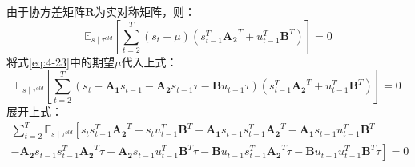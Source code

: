 由于协方差矩阵$\mathbf{R}$为实对称矩阵，则：
\begin{equation}
    \mathbb{E}_{s \mid \tau^{old}}\left[\sum_{t=2}^T \left(s_t-\mu\right)\left(s_{t-1}^T\mathbf{A_2}^T +u_{t-1}^T\mathbf{B}^T \right)\right] = 0
    \label{eq:4-29}
\end{equation}
将式\ref{eq:4-23}中的期望$\mu$代入上式：
\begin{equation}
    \mathbb{E}_{s \mid \tau^{old}}\left[\sum_{t=2}^T \left(s_t-\mathbf{A_1}s_{t-1}-\mathbf{A_2}s_{t-1}\tau-\mathbf{B}u_{t-1}\tau \right)\left(s_{t-1}^T\mathbf{A_2}^T +u_{t-1}^T\mathbf{B}^T \right)\right] = 0
    \label{eq:4-30}
\end{equation}
展开上式：
\begin{equation}
    \begin{gathered}
    \sum_{t=2}^T \mathbb{E}_{s \mid \tau^{old}}\left[s_ts_{t-1}^T\mathbf{A_2}^T + s_tu_{t-1}^T\mathbf{B}^T -\mathbf{A_1}s_{t-1}s_{t-1}^T\mathbf{A_2}^T - \mathbf{A_1}s_{t-1}u_{t-1}^T\mathbf{B}^T \right. \\ 
    \left. - \mathbf{A_2}s_{t-1}s_{t-1}^T\mathbf{A_2}^T\tau -\mathbf{A_2}s_{t-1}u_{t-1}^T\mathbf{B}^T\tau - \mathbf{B}u_{t-1}s_{t-1}^T\mathbf{A_2}^T\tau - \mathbf{B}u_{t-1}u_{t-1}^T\mathbf{B}^T\tau\right] = 0
    \end{gathered}
    \label{eq:4-31}
\end{equation}

